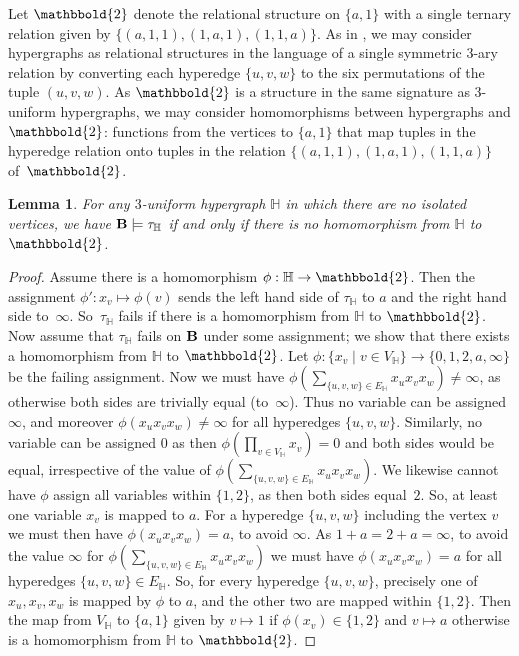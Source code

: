 \documentclass[eqnor,reqno]{amsart}
\theoremstyle{plain}
\newtheorem{lem}[thm]{Lemma}
\theoremstyle{definition}
\begin{document}
Let $\mathbbold{2}$ denote the relational structure on $\{a,1\}$ with a single ternary relation given by $\{(a,1,1),(1,a,1),(1,1,a)\}$.  As in \cite{jacham}, we may consider hypergraphs as relational structures in the language of a single symmetric $3$-ary relation by converting each hyperedge $\{u,v,w\}$ to the six permutations of the tuple $(u,v,w)$.  As $\mathbbold{2}$ is a structure in the same signature as 3-uniform hypergraphs, we may consider homomorphisms between hypergraphs and $\mathbbold{2}$: functions from the vertices to $\{a,1\}$ that map tuples in the hyperedge relation onto tuples in the relation $\{(a,1,1),(1,a,1),(1,1,a)\}$ of~$\mathbbold{2}$.
\begin{lem}\label{lem:hypergraphlaw}
For any $3$-uniform hypergraph $\mathbb{H}$ in which there are no isolated vertices, we have ${\bf B}\models \tau_\mathbb{H}$ if and only if there is no homomorphism from $\mathbb{H}$ to $\mathbbold{2}$.
\end{lem}
\begin{proof}
Assume there is a homomorphism $\phi:\mathbb{H}\to\mathbbold{2}$.  Then the assignment $\phi':x_v\mapsto \phi(v)$ sends the left hand side of 
$\tau_\mathbb{H}$ to $a$ and the right hand side to~$\infty$.  So~$\tau_\mathbb{H}$ fails if there is a homomorphism from $\mathbb{H}$ to $\mathbbold{2}$.  
Now assume that $\tau_\mathbb{H}$ fails on ${\bf B}$ under some assignment; we show that there exists a homomorphism from $\mathbb{H}$ to $\mathbbold{2}$.  Let $\phi:\{x_v\mid v\in V_\mathbb{H}\}\to \{0,1,2,a,\infty\}$ be the failing assignment.  
Now we must have $\phi(\sum_{\{u,v,w\}\in E_\mathbb{H}} x_ux_vx_w)\neq\infty$, as otherwise both sides are trivially equal (to~$\infty$).  
Thus no variable can be assigned $\infty$, and moreover $\phi(x_ux_vx_w)\neq \infty$ for all hyperedges $\{u,v,w\}$.  
Similarly, no variable can be assigned $0$ as then $\phi(\prod_{v\in V_\mathbb{H}} x_v)=0$ and  both sides would be equal, irrespective of the value of $\phi(\sum_{\{u,v,w\}\in E_\mathbb{H}} x_ux_vx_w)$.  
We likewise cannot have $\phi$ assign all variables within $\{1,2\}$, as then both sides equal~$2$.  
So, at least one variable $x_v$ is mapped to $a$.  
For a hyperedge $\{u,v,w\}$ including the vertex $v$ we must then have $\phi(x_ux_vx_w)=a$, to avoid $\infty$.  As $1+a =2+a=\infty$, to avoid the value $\infty$ for $\phi(\sum_{\{u,v,w\}\in E_\mathbb{H}} x_ux_vx_w)$ we must have $\phi(x_ux_vx_w)=a$ for all hyperedges $\{u,v,w\}\in E_\mathbb{H}$.  
So, for every hyperedge $\{u,v,w\}$, precisely one of $x_u,x_v,x_w$ is mapped by $\phi$ to $a$, and the other two are mapped within $\{1,2\}$.  
Then the map from $V_\mathbb{H}$ to $\{a,1\}$ given by $v\mapsto 1$ if $\phi(x_v)\in \{1,2\}$ and $v\mapsto a$ otherwise is a homomorphism from  $\mathbb{H}$ to $\mathbbold{2}$.
\end{proof}
\end{document}
